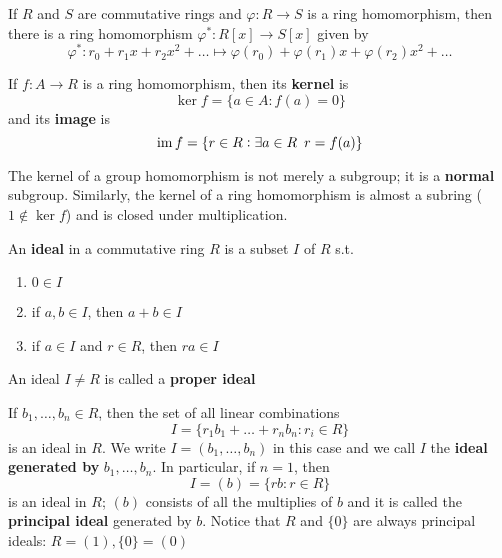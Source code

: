\documentclass[11pt]{article}
\begin{document}
\begin{proposition}[]
\label{prop3.48}
If \(R\) and \(S\) are commutative rings and \(\varphi:R\to S\) is a ring
homomorphism, then there is a ring homomorphism \(\varphi^*:R[x]\to S[x]\)
given by
\begin{equation*}
\varphi^*:r_0+r_1x+r_2x^2+\dots\mapsto\varphi(r_0)+\varphi(r_1)x+
\varphi(r_2)x^2+\dots
\end{equation*}
\end{proposition}

\begin{definition}[]
If \(f:A\to R\) is a ring homomorphism, then its \textbf{kernel} is
\begin{equation*}
\ker f=\{a\in A:f(a)=0\}
\end{equation*}
and its \textbf{image} is 
\begin{equation*}
\operatorname{im} f=\{r\in R:\exists a\in R\enspace r=f(a)\}
\end{equation*}
\end{definition}

The kernel of a group homomorphism is not merely a subgroup; it is a \textbf{normal}
subgroup. Similarly, the kernel of a ring homomorphism is almost a subring
(\(1\not\in\ker f\))
and is closed under multiplication.

\begin{definition}[]
An \textbf{ideal} in a commutative ring \(R\) is a subset \(I\) of \(R\) s.t. 
\begin{enumerate}
\item \(0\in I\)
\item if \(a,b\in I\), then \(a+b\in I\)
\item if \(a\in I\) and \(r\in R\), then \(ra\in I\)
\end{enumerate}
\end{definition}

An ideal \(I\neq R\) is called a \textbf{proper ideal}

\begin{examplle}[]
If \(b_1,\dots,b_n\in R\), then the set of all linear combinations
\begin{equation*}
I=\{r_1b_1+\dots+r_nb_n:r_i\in R\}
\end{equation*}
is an ideal in \(R\). We write \(I=(b_1,\dots,b_n)\) in this case and we call
\(I\) the \textbf{ideal generated by} \(b_1,\dots,b_n\). In particular, if \(n=1\), then
\begin{equation*}
I=(b)=\{rb:r\in R\}
\end{equation*}
is an ideal in \(R\); \((b)\) consists of all the multiplies of \(b\) and it is
called the \textbf{principal ideal} generated by \(b\). Notice that \(R\) and \(\{0\}\) are
always principal ideals: \(R=(1),\{0\}=(0)\)
\end{examplle}
\end{document}
